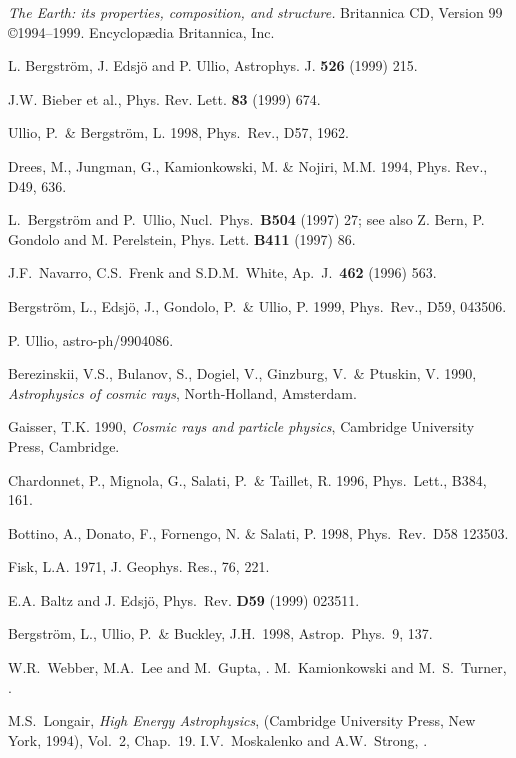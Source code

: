 \begin{thebibliography}{99}
\emph{The Earth: its properties, composition, and structure.}
Britannica CD, Version 99 \copyright 1994--1999.
Encyclop{\ae}dia Britannica, Inc.

 L. Bergstr\"om, J. Edsj\"o and P. Ullio, Astrophys. J. {\bf 526}
(1999) 215.

J.W. Bieber et al., Phys. Rev. Lett. {\bf 83} (1999) 674.

 Ullio, P.\ \& Bergstr\"om, L. 1998,
Phys.\ Rev., {D57},  1962.

Drees, M., Jungman, G., Kamionkowski, M.
\& Nojiri, M.M. 1994, Phys. Rev., D49, 636.

 L.~Bergstr{\"o}m and P.~Ullio, Nucl.\ Phys.\ {\bf B504}
(1997) 27; see also Z. Bern, P. Gondolo and M. Perelstein,
Phys. Lett. {\bf B411} (1997) 86.

 J.F.~Navarro, C.S.~Frenk and S.D.M.~White,
Ap.\ J.\ {\bf 462} (1996) 563.

 Bergstr{\"o}m, L., Edsj{\"o}, J., Gondolo, P.\ \&
Ullio, P. 1999, Phys.\ Rev., {D59}, 043506.

 P. Ullio, astro-ph/9904086.

 Berezinskii, V.S., Bulanov, S.,
Dogiel, V., Ginzburg, V.\ \& Ptuskin, V. 1990, {\em Astrophysics
of cosmic rays}, North-Holland, Amsterdam.

 Gaisser, T.K. 1990, {\em Cosmic rays and
particle physics}, Cambridge University Press, Cambridge.

Chardonnet, P., Mignola, G., Salati, P.\ \&
Taillet, R. 1996, Phys.\ Lett., {B384}, 161.

 Bottino, A., Donato, F.,
Fornengo, N. \& Salati, P. 1998, Phys.\ Rev.\ {D58} 123503.

Fisk, L.A. 1971, J. Geophys. Res., {76}, {221}.

  E.A. Baltz and J. Edsj{\"o},
Phys.\ Rev. {\bf D59} (1999) 023511.

 Bergstr\"om, L.,
Ullio, P.\ \& Buckley, J.H.\ 1998, Astrop.\ Phys.\ {9}, 137.

W.R.~Webber, M.A.~Lee and M.~Gupta, .
M.~Kamionkowski and M.~S.~Turner, .

M.S.~Longair, {\em High Energy Astrophysics}, (Cambridge University Press, New
York, 1994), Vol.\ 2, Chap.\ 19.
I.V.~Moskalenko and A.W.~Strong, .


\end{thebibliography}
